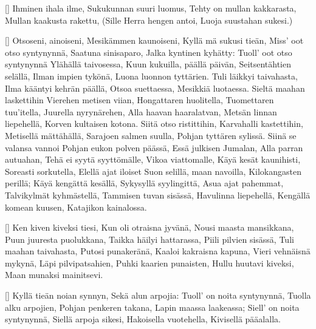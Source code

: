 []
  \beginverse
    Ihminen ihala ilme,
    Sukukunnan suuri luomus,
    Tehty on mullan kakkarasta,
    Mullan kaakusta rakettu,
    (Sille Herra hengen antoi,
    Luoja suustahan sukesi.)
  \endverse
\endsong


[]
  \beginverse
    Otsoseni, ainoiseni,
    Mesikämmen kaunoiseni,
    Kyllä mä sukusi tieän,
    Miss' oot otso syntynynnä,
    Saatuna sinisaparo,
    Jalka kyntinen kyhätty:
    Tuoll' oot otso syntynynnä
    Ylähällä taivosessa,
    Kuun kukuilla, päällä päivän,
    Seitsentähtien selällä,
    Ilman impien tykönä,
    Luona luonnon tyttärien.
  \endverse
  \beginverse
    Tuli läikkyi taivahasta,
    Ilma kääntyi kehrän päällä,
    Otsoa suettaessa,
    Mesikkiä luotaessa.
    Sieltä maahan laskettihin
    Vierehen metisen viian,
    Hongattaren huolitella,
    Tuomettaren tuu'itella,
    Juurella nyrynärehen,
    Alla haavan haaralatvan,
    Metsän linnan liepehellä,
    Korven kultaisen kotona.
  \endverse
  \beginverse
    Siitä otso ristittihin,
    Karvahalli kastettihin,
    Metisellä mättähällä,
    Sarajoen salmen suulla,
    Pohjan tyttären sylissä.
    Siinä se valansa vannoi
    Pohjan eukon polven päässä,
    Essä julkisen Jumalan,
    Alla parran autuahan,
    Tehä ei syytä syyttömälle,
    Vikoa viattomalle,
    Käyä kesät kaunihisti,
    Soreasti sorkutella,
    Elellä ajat iloiset
    Suon selillä, maan navoilla,
    Kilokangasten perillä;
    Käyä kengättä kesällä,
    Sykysyllä syylingittä,
    Asua ajat pahemmat,
    Talvikylmät kyhmästellä,
    Tammisen tuvan sisässä,
    Havulinna liepehellä,
    Kengällä komean kuusen,
    Katajikon kainalossa.
  \endverse
\endsong


[]
  \beginverse
    Ken kiven kiveksi tiesi,
    Kun oli otraisna jyvänä,
    Nousi maasta mansikkana,
    Puun juuresta puolukkana,
    Taikka häilyi hattarassa,
    Piili pilvien sisässä,
    Tuli maahan taivahasta,
    Putosi punakeränä,
    Kaaloi kakraisna kapuna,
    Vieri vehnäisnä mykynä,
    Läpi pilvipatsahien,
    Puhki kaarien punaisten,
    Hullu huutavi kiveksi,
    Maan munaksi mainitsevi.
  \endverse
\endsong


[]
  \beginverse
    Kyllä tieän noian synnyn,
    Sekä alun arpojia:
    Tuoll' on noita syntynynnä,
    Tuolla alku arpojien,
    Pohjan penkeren takana,
    Lapin maassa laakeassa;
    Siell' on noita syntynynnä,
    Siellä arpoja sikesi,
    Hakoisella vuotehella,
    Kivisellä pääalalla.
  \endverse
\endsong


